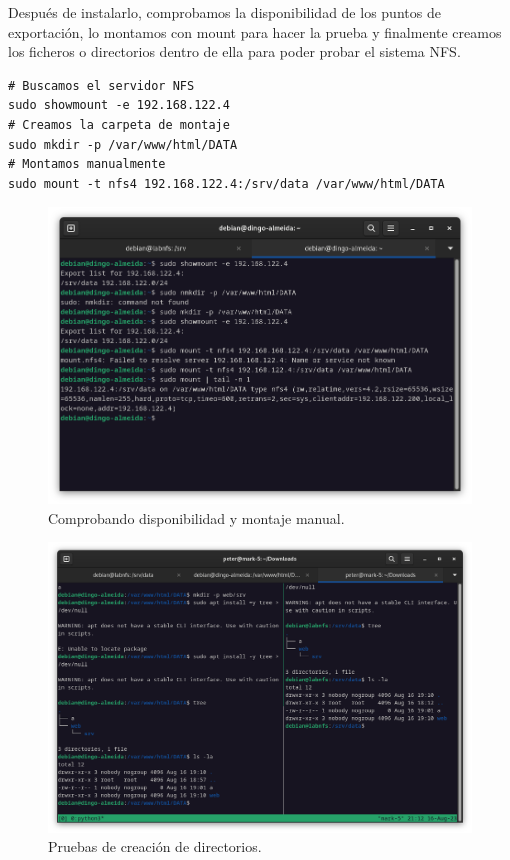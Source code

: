 Después de instalarlo, comprobamos la disponibilidad de los puntos de exportación, lo montamos con mount para hacer la prueba y finalmente creamos los ficheros o directorios dentro de ella para poder probar el sistema NFS.
\begin{lstlisting}[style=mybash]
# Buscamos el servidor NFS
sudo showmount -e 192.168.122.4
# Creamos la carpeta de montaje
sudo mkdir -p /var/www/html/DATA
# Montamos manualmente
sudo mount -t nfs4 192.168.122.4:/srv/data /var/www/html/DATA
\end{lstlisting}

\begin{figure}[H]
	\centering
	\includegraphics[scale=0.30]{04}
	\caption{Comprobando disponibilidad y montaje manual.}
\end{figure}

\begin{figure}[H]
	\centering
	\includegraphics[scale=0.30]{05}
	\caption{Pruebas de creación de directorios.}
\end{figure}

